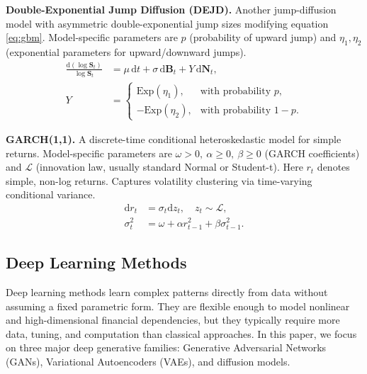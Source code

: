 \begin{enumerate}[label=\textbf{[A\arabic*]}]
        \item \label{alg:dejd} \textbf{Double-Exponential Jump 
        Diffusion (DEJD).} 
        Another jump-diffusion model with asymmetric double-exponential 
        jump sizes modifying equation \eqref{eq:gbm}. 
        Model-specific parameters are \(p\) 
        (probability of upward jump) and \(\eta_1, \eta_2\) 
        (exponential parameters for upward/downward jumps).
        \begin{align}
          \frac{\mathrm{d}(\log\mathbf{S}_t)}{\log\mathbf{S}_t} &= \mu\,\mathrm{d}t + \sigma\,\mathrm{d}\mathbf{B}_t + Y\,\mathrm{d}\mathbf{N}_t,\\
          Y &=
          \begin{cases}
          \mathrm{Exp}(\eta_1), &\text{with probability } p,\\[4pt]
          -\mathrm{Exp}(\eta_2), &\text{with probability } 1-p.
          \end{cases} \nonumber
        \end{align}

        \item \label{alg:garch} \textbf{GARCH(1,1).} 
        A discrete-time conditional heteroskedastic model for 
        simple returns. Model-specific parameters are \(\omega>0,\ 
        \alpha\ge0,\ \beta\ge0\) (GARCH coefficients) and 
        \(\mathcal L\) (innovation law, usually standard 
        Normal or Student-t). Here $r_t$ denotes simple, non-log 
        returns. Captures volatility clustering via 
        time-varying conditional variance.
        \begin{align}
          \mathrm{d}r_t &= \sigma_t \mathrm{d}z_t,\quad z_t\sim\mathcal L,\\
          \sigma_t^2 &= \omega + \alpha r_{t-1}^2 + \beta \sigma_{t-1}^2. \nonumber
        \end{align}
      \end{enumerate}


  \subsection{Deep Learning Methods}\label{sub:deep-learning-methods}
    Deep learning methods learn complex patterns directly from data
    without assuming a fixed parametric form. They are flexible enough
    to model nonlinear and high-dimensional financial dependencies, but
    they typically require more data, tuning, and computation than
    classical approaches. In this paper, we focus on three major deep
    generative families: Generative Adversarial Networks (GANs),
    Variational Autoencoders (VAEs), and diffusion models.

